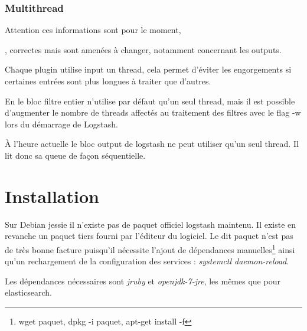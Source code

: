 \subsubsection{Multithread}
Attention ces informations sont pour le moment, \date{Jeudi 16 Avril}, correctes 
mais sont amenées à changer, notamment concernant les outputs.

Chaque plugin utilise input un \gls{thread}, cela permet d'éviter les engorgements si  
certaines entrées sont plus longues à traiter que d'autres.

En le bloc filtre entier n'utilise par défaut qu'un seul thread, mais il est possible 
d'augmenter le nombre de threads affectés au traitement des filtres avec le \gls{flag}
-w lors du démarrage de Logstash.

À l'heure actuelle le bloc output de logstash ne peut utiliser qu'un seul thread.
Il lit donc sa queue de façon séquentielle.


\section{Installation}
%
%
%
%
%
%
%
%
%




Sur Debian jessie il n'existe pas de paquet officiel logstash maintenu. Il existe 
en revanche un paquet tiers
fourni par l'éditeur du logiciel. Le dit paquet n'est pas de très bonne facture  
puisqu'il nécessite l'ajout de dépendances manuelles\footnote{wget paquet, 
dpkg -i paquet, apt-get install -f} ainsi qu'un rechargement de 
la configuration des services : \emph{systemctl daemon-reload}.

Les dépendances nécessaires sont \emph{jruby} et \emph{openjdk-7-jre}, les mêmes 
que pour elasticsearch.

